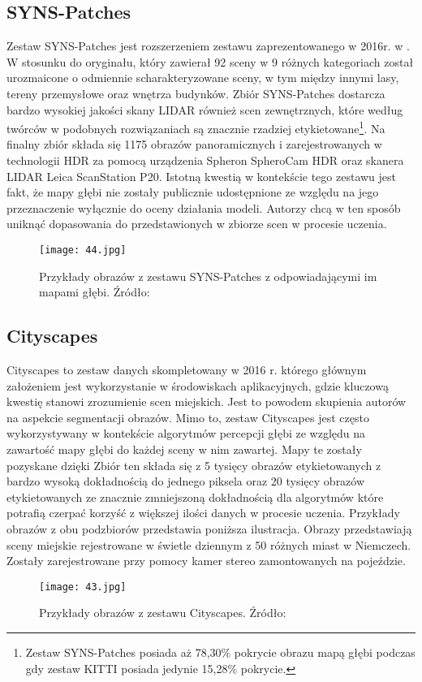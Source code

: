 \subsection{SYNS-Patches}
Zestaw SYNS-Patches \cite{spencer2022deconstructing} jest rozszerzeniem zestawu zaprezentowanego w 2016r. w \cite{adams2016syns}. W stosunku do oryginału, który zawierał 92 sceny w 9 różnych kategoriach został urozmaicone o odmiennie scharakteryzowane sceny, w tym między innymi lasy, tereny przemysłowe oraz wnętrza budynków. Zbiór SYNS-Patches dostarcza bardzo wysokiej jakości skany LIDAR również scen zewnętrznych, które według twórców w podobnych rozwiązaniach są znacznie rzadziej etykietowane\footnote{Zestaw SYNS-Patches posiada aż 78,30\% pokrycie obrazu mapą głębi podczas gdy zestaw KITTI posiada jedynie 15,28\% pokrycie.}. Na finalny zbiór składa się 1175 obrazów panoramicznych i zarejestrowanych w technologii HDR za pomocą urządzenia Spheron SpheroCam HDR oraz skanera LIDAR Leica ScanStation P20. Istotną kwestią w kontekście tego zestawu jest fakt, że mapy głębi nie zostały publicznie udostępnione ze względu na jego przeznaczenie wyłącznie do oceny działania modeli. Autorzy chcą w ten sposób uniknąć dopasowania do przedstawionych w zbiorze scen w procesie uczenia.
\begin{figure}[H]
    \centering
    \texttt{[image: 44.jpg]}
    \caption{Przykłady obrazów z zestawu SYNS-Patches z odpowiadającymi im mapami głębi. Źródło: \cite{spencer2022deconstructing}}
    \label{fig:syns-example}
\end{figure} 

\subsection{Cityscapes}
Cityscapes \cite{cordts2016cityscapes} to zestaw danych skompletowany w 2016 r. którego głównym założeniem jest wykorzystanie w środowiskach aplikacyjnych, gdzie kluczową kwestię stanowi zrozumienie scen miejskich. Jest to powodem skupienia autorów na aspekcie segmentacji obrazów. Mimo to, zestaw Cityscapes jest często wykorzystywany w kontekście algorytmów percepcji głębi ze względu na zawartość mapy głębi do każdej sceny w nim zawartej. Mapy te zostały pozyskane dzięki  Zbiór ten składa się z 5 tysięcy obrazów etykietowanych z bardzo wysoką dokładnością do jednego piksela oraz 20 tysięcy obrazów etykietowanych ze znacznie zmniejszoną dokładnością dla algorytmów które potrafią czerpać korzyść z większej ilości danych w procesie uczenia. Przykłady obrazów z obu podzbiorów przedstawia poniższa ilustracja. Obrazy przedstawiają sceny miejskie rejestrowane w świetle dziennym z 50 różnych miast w Niemczech. Zostały zarejestrowane przy pomocy kamer stereo zamontowanych na pojeździe.
\begin{figure}[H]
    \centering
    \texttt{[image: 43.jpg]}
    \caption{Przykłady obrazów z zestawu Cityscapes. Źródło: \cite{cordts2016cityscapes}}
    \label{fig:cityscapes-example}
\end{figure} 

